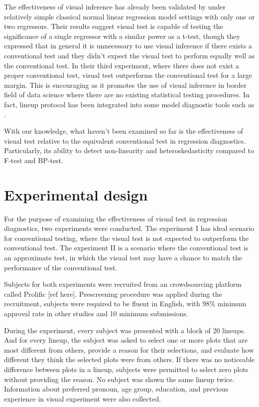 \documentclass[]{interact}
\theoremstyle{plain}%
\theoremstyle{definition}
\theoremstyle{remark}
\begin{document}
The effectiveness of visual inference has already been validated by
\citet{majumder_validation_2013} under relatively simple classical
normal linear regression model settings with only one or two regressors.
Their results suggest visual test is capable of testing the significance
of a single regressor with a similar power as a t-test, though they
expressed that in general it is unnecessary to use visual inference if
there exists a conventional test and they didn't expect the visual test
to perform equally well as the conventional test. In their third
experiment, where there does not exist a proper conventional test,
visual test outperforms the conventional test for a large margin. This
is encouraging as it promotes the use of visual inference in border
field of data science where there are no existing statistical testing
procedures. In fact, lineup protocol has been integrated into some model
diagnostic tools such as \citet{loy2013diagnostic}.

With our knowledge, what haven't been examined so far is the
effectiveness of visual test relative to the equivalent conventional
test in regression diagnostics. Particularly, its ability to detect
non-linearity and heteroskedasticity compared to F-test and BP-test.

\hypertarget{experimental-design}{%
\section{Experimental design}\label{experimental-design}}

For the purpose of examining the effectiveness of visual test in
regression diagnostics, two experiments were conducted. The experiment I
has ideal scenario for conventional testing, where the visual test is
not expected to outperform the conventional test. The experiment II is a
scenario where the conventional test is an approximate test, in which
the visual test may have a chance to match the performance of the
conventional test.

Subjects for both experiments were recruited from an crowdsourcing
platform called Prolific {[}ref here{]}. Prescreening procedure was
applied during the recruitment, subjects were required to be fluent in
English, with \(98\%\) minimum approval rate in other studies and 10
minimum submissions.

During the experiment, every subject was presented with a block of 20
lineups. And for every lineup, the subject was asked to select one or
more plots that are most different from others, provide a reason for
their selections, and evaluate how different they think the selected
plots were from others. If there was no noticeable difference between
plots in a lineup, subjects were permitted to select zero plots without
providing the reason. No subject was shown the same lineup twice.
Information about preferred pronoun, age group, education, and previous
experience in visual experiment were also collected.
\end{document}
